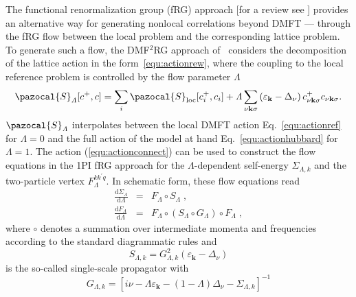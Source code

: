 \documentclass[rmp,aps,reprint,amsmath,amssymb,superscriptaddress,showpacs,nofootinbib]{revtex4-1}
\begin{document}
The functional renormalization group (fRG) approach [for a review see ] provides an alternative way for generating nonlocal correlations beyond DMFT --- through the fRG flow between the local problem and the corresponding lattice problem. To generate such a flow, the DMF$^2$RG approach of~ considers the decomposition of the lattice action in the form~\eqref{equ:actionrew}, where the coupling to the local reference problem is controlled by the flow parameter $\mathit{\Lambda}$
\begin{equation}  
\label{equ:actionconnect}
  \pazocal{S}_\mathit{\Lambda} [c^+,c]=\sum_{i}\pazocal{S}_{\text{loc}}[c^+_{i},c_{i}]+\mathit{\Lambda}\sum_{\nu%
  \mathbf{k}\sigma}\left( \varepsilon_{\mathbf{k}}-\Delta_{\nu}\right)c^+_{\nu%
  \mathbf{k}\sigma}c_{\nu\mathbf{k}\sigma}.
\end{equation}
$\pazocal{S}_\mathit{\Lambda}$ interpolates between the local DMFT action Eq.~\eqref{equ:actionref} for $\mathit{\Lambda}=0$ and the full action of the model at hand Eq.~\eqref{equ:actionhubbard} for $\mathit{\Lambda}=1$. The  action (\ref{equ:actionconnect}) can be used to construct the flow equations in the 1PI fRG approach for the  $\mathit{\Lambda} $-dependent self-energy $\Sigma _{\mathit{\Lambda},k}$ and the two-particle vertex $F_{\mathit{\Lambda} }^{kk^{\prime }q}$. In schematic form, these flow equations read
\begin{subequations}
\label{eqn:DMF2RG_floweq}
\begin{eqnarray}
  \frac{\mathrm{d}\Sigma _{\mathbf{\mathit{\Lambda} }}}{\mathrm{d}\mathit{\Lambda} } &=&F_\mathit{\Lambda}\circ S_\mathit{\Lambda} \; ,
  \label{eqn:DMF2RG_floweq0}\\
  \frac{\mathrm{d}F_{\mathbf{\mathit{\Lambda} }}}{\mathrm{d}\mathit{\Lambda} } &=&F_\mathit{\Lambda} \circ (S_\mathit{\Lambda} \circ
  G_\mathit{\Lambda})\circ F_\mathit{\Lambda}\; ,
\end{eqnarray}%
\end{subequations}
where $\circ $ denotes a summation over intermediate momenta and frequencies according to the standard diagrammatic rules and 
\begin{equation}
\label{eq:single}
  S_{\mathit{\Lambda},k}\!=\! G^2_{\mathit{\Lambda},k}\!
  \left( \varepsilon_{\mathbf k}-\Delta_\nu \right)
\end{equation}
is the so-called single-scale propagator with
\begin{equation}
  G_{\mathit{\Lambda}, k}=\left[i\nu-\mathit{\Lambda}\varepsilon_{\mathbf{k}}-(1-\mathit{\Lambda}) \Delta_\nu-\Sigma_{\mathit{\Lambda},k}\right]^{-1}
\end{equation}
\end{document}
